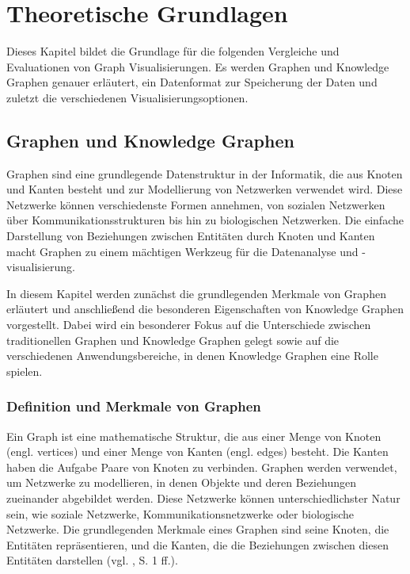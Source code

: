 
\chapter{Theoretische Grundlagen}
\label{theory}

Dieses Kapitel bildet die Grundlage für die folgenden Vergleiche und Evaluationen von Graph Visualisierungen. Es werden Graphen und Knowledge Graphen genauer erläutert, ein Datenformat zur Speicherung der Daten und zuletzt die verschiedenen Visualisierungsoptionen.

\section{Graphen und Knowledge Graphen}

Graphen sind eine grundlegende Datenstruktur in der Informatik, die aus Knoten und Kanten besteht und zur Modellierung von Netzwerken verwendet wird. Diese Netzwerke können verschiedenste Formen annehmen, von sozialen Netzwerken über Kommunikationsstrukturen bis hin zu biologischen Netzwerken. Die einfache Darstellung von Beziehungen zwischen Entitäten durch Knoten und Kanten macht Graphen zu einem mächtigen Werkzeug für die Datenanalyse und -visualisierung.

In diesem Kapitel werden zunächst die grundlegenden Merkmale von Graphen erläutert und anschließend die besonderen Eigenschaften von Knowledge Graphen vorgestellt. Dabei wird ein besonderer Fokus auf die Unterschiede zwischen traditionellen Graphen und Knowledge Graphen gelegt sowie auf die verschiedenen Anwendungsbereiche, in denen Knowledge Graphen eine Rolle spielen.

\subsection{Definition und Merkmale von Graphen}

Ein Graph ist eine mathematische Struktur, die aus einer Menge von Knoten (engl. vertices) und einer Menge von Kanten (engl. edges) besteht. Die Kanten haben die Aufgabe Paare von Knoten zu verbinden. Graphen werden verwendet, um Netzwerke zu modellieren, in denen Objekte und deren Beziehungen zueinander abgebildet werden. Diese Netzwerke können unterschiedlichster Natur sein, wie soziale Netzwerke, Kommunikationsnetzwerke oder biologische Netzwerke. Die grundlegenden Merkmale eines Graphen sind seine Knoten, die Entitäten repräsentieren, und die Kanten, die die Beziehungen zwischen diesen Entitäten darstellen (vgl. \cite{graphIntroduction:Wilson}, S. 1 ff.).

